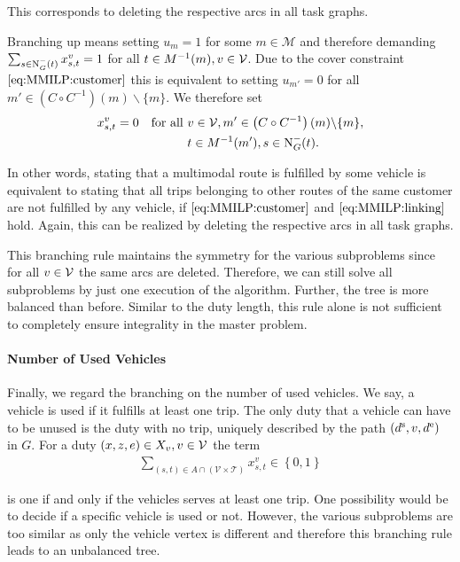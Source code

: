 This corresponds to deleting the respective arcs in all task graphs.

Branching up means setting ${u_m = 1}$ for some ${m\in\mathcal{M}}$ and therefore demanding\linebreak
${\sum_{s\in\operatorname{N}_G^-(t)}x_{s,t}^v = 1}$ for all ${t\in M^{-1}(m)}, v\in\mathcal{V}$. Due to the cover constraint $\eqref{eq:MMILP:customer}$ this is equivalent to setting ${u_{m'} = 0}$ for all ${m'\in\left(C\circ C^{-1}\right)(m)\backslash\{m\}}$. We therefore set
\begin{align*}
	x^v_{s,t} = 0 && \text{for all } & v\in\mathcal{V}, m'\in\left(C\circ C^{-1}\right)(m)\backslash\{m\}, \\
	&&& t\in M^{-1}(m'), s\in\operatorname{N}_G^-(t).
\end{align*}

In other words, stating that a multimodal route is fulfilled by some vehicle is equivalent to stating that all trips belonging to other routes of the same customer are not fulfilled by any vehicle, if $\eqref{eq:MMILP:customer}$ and $\eqref{eq:MMILP:linking}$ hold. Again, this can be realized by deleting the respective arcs in all task graphs.

This branching rule maintains the symmetry for the various subproblems since for all $v\in\mathcal{V}$ the same arcs are deleted. Therefore, we can still solve all subproblems by just one execution of the algorithm. Further, the tree is more balanced than before. Similar to the duty length, this rule alone is not sufficient to completely ensure integrality in the master problem.

\paragraph{Number of Used Vehicles} \parfill

Finally, we regard the branching on the number of used vehicles. We say, a vehicle is used if it fulfills at least one trip. The only duty that a vehicle can have to be unused is the duty with no trip, uniquely described by the path ${\left(d^{\operatorname{s}},v,d^{\operatorname{e}}\right)}$ in $G$. For a duty $(x,z,e)\in X_v, v\in\mathcal{V}$ the term
\begin{align*}
	\sum_{(s,t)\in A\cap\left(\mathcal{V}\times\mathcal{T}\right)} x^v_{s,t}\in\left\{0,1\right\}
\end{align*}

is one if and only if the vehicles serves at least one trip. One possibility would be to decide if a specific vehicle is used or not. However, the various subproblems are too similar as only the vehicle vertex is different and therefore this branching rule leads to an unbalanced tree.

